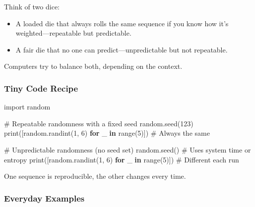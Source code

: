 \documentclass[
  letterpaper,
  DIV=11,
  numbers=noendperiod]{scrreprt}
\newenvironment{Shaded}{\begin{snugshade}}{\end{snugshade}}
\newcommand{\BuiltInTok}[1]{\textcolor[rgb]{0.00,0.23,0.31}{#1}}
\newcommand{\CommentTok}[1]{\textcolor[rgb]{0.37,0.37,0.37}{#1}}
\newcommand{\ControlFlowTok}[1]{\textcolor[rgb]{0.00,0.23,0.31}{\textbf{#1}}}
\newcommand{\DecValTok}[1]{\textcolor[rgb]{0.68,0.00,0.00}{#1}}
\newcommand{\ImportTok}[1]{\textcolor[rgb]{0.00,0.46,0.62}{#1}}
\newcommand{\KeywordTok}[1]{\textcolor[rgb]{0.00,0.23,0.31}{\textbf{#1}}}
\newcommand{\NormalTok}[1]{\textcolor[rgb]{0.00,0.23,0.31}{#1}}
\providecommand{\tightlist}{%
  \setlength{\itemsep}{0pt}\setlength{\parskip}{0pt}}
\begin{document}
Think of two dice:

\begin{itemize}
\tightlist
\item
  A loaded die that always rolls the same sequence if you know how it's
  weighted---repeatable but predictable.
\item
  A fair die that no one can predict---unpredictable but not repeatable.
\end{itemize}

Computers try to balance both, depending on the context.

\subsubsection{Tiny Code Recipe}\label{tiny-code-recipe-24}

\begin{Shaded}
\begin{Highlighting}[]
\ImportTok{import}\NormalTok{ random}

\CommentTok{\# Repeatable randomness with a fixed seed}
\NormalTok{random.seed(}\DecValTok{123}\NormalTok{)}
\BuiltInTok{print}\NormalTok{([random.randint(}\DecValTok{1}\NormalTok{, }\DecValTok{6}\NormalTok{) }\ControlFlowTok{for}\NormalTok{ \_ }\KeywordTok{in} \BuiltInTok{range}\NormalTok{(}\DecValTok{5}\NormalTok{)])  }\CommentTok{\# Always the same}

\CommentTok{\# Unpredictable randomness (no seed set)}
\NormalTok{random.seed()  }\CommentTok{\# Uses system time or entropy}
\BuiltInTok{print}\NormalTok{([random.randint(}\DecValTok{1}\NormalTok{, }\DecValTok{6}\NormalTok{) }\ControlFlowTok{for}\NormalTok{ \_ }\KeywordTok{in} \BuiltInTok{range}\NormalTok{(}\DecValTok{5}\NormalTok{)])  }\CommentTok{\# Different each run}
\end{Highlighting}
\end{Shaded}

One sequence is reproducible, the other changes every time.

\subsubsection{Everyday Examples}\label{everyday-examples-25}
\end{document}

